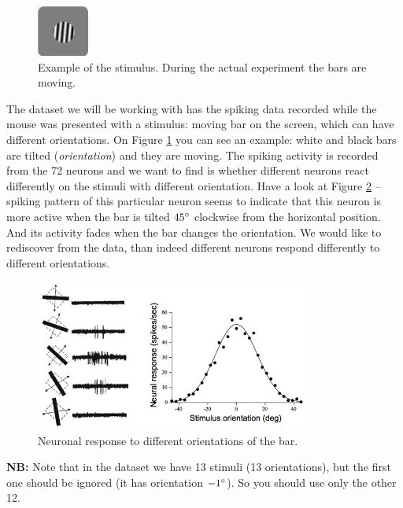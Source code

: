 \documentclass[a4paper,11pt]{article}
\begin{document}
\begin{figure}
	\centering
	\vspace{-12pt}
	\includegraphics[width=0.15\textwidth]{orientationstimulus.jpg}
	\caption{Example of the stimulus. During the actual experiment the bars are moving.}
	\label{fig:stimulusexample}
	\vspace{-5pt}
\end{figure}
The dataset we will be working with has the spiking data recorded while the mouse was presented with a stimulus: moving bar on the screen, which can have different orientations. On Figure \ref{fig:stimulusexample} you can see an example: white and black bars are tilted (\emph{orientation}) and they are moving. The spiking activity is recorded from the 72 neurons and we want to find is whether different neurons react differently on the stimuli with different orientation. Have a look at Figure \ref{fig:orientationresponse} -- spiking pattern of this particular neuron seems to indicate that this neuron is more active when the bar is tilted $45\degree$ clockwise from the horizontal position. And its activity fades when the bar changes the orientation. We would like to rediscover from the data, than indeed different neurons respond differently to different orientations.
\begin{figure}[H]
	\centering
	\includegraphics[width=0.8\textwidth]{orientation.jpg} 
	\caption{Neuronal response to different orientations of the bar.}
	\label{fig:orientationresponse}
\end{figure}
\textbf{NB:} Note that in the dataset we have 13 stimuli (13 orientations), but the first one should be ignored (it has orientation $-1\degree$). So you should use only the other 12.
\end{document}
